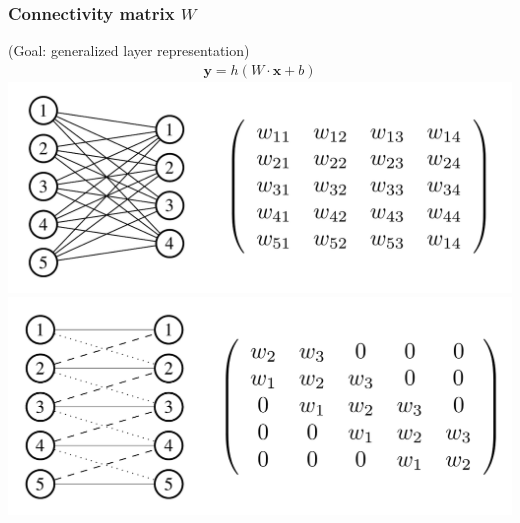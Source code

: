 \documentclass[t,9pt,pdftex]{beamer}
\theoremstyle{definition}
\begin{document}
\begin{frame}[c, label=current]
  \frametitle{Connectivity matrix $W$}
  (Goal: generalized layer representation)\\
  \begin{gather*}
  \textbf{y} = h(W \cdot \textbf{x} + b)
  \end{gather*}
  \centering\includegraphics[width=0.6\linewidth,height=\textheight,keepaspectratio]{mlp.png}\\
  \centering\includegraphics[width=0.6\linewidth,height=\textheight,keepaspectratio]{cnn.png}
\end{frame}
\end{document}
